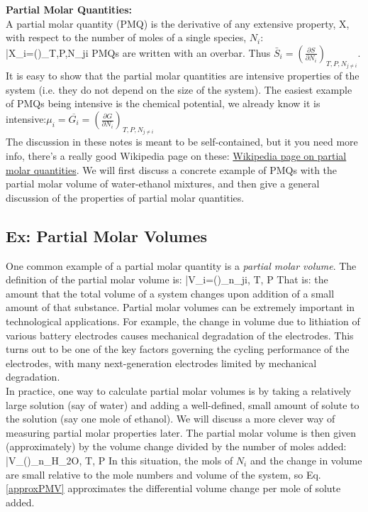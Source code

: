 \documentclass[12pt]{article}
\begin{document}
\textbf{Partial Molar Quantities:}\\
A partial molar quantity (PMQ) is the derivative of any extensive property, X, with respect to the number of moles of a single species, $N_i$:\\
\eqs \bar{X}_i=\left(\right)_{T,P,N_{j\neq i}}\eqe
PMQs are written with an overbar. Thus $\bar{S}_i=\left(\frac{\partial S}{\partial N_i}\right)_{T,P,N_{j\neq i}}$. It is easy to show that the partial molar quantities are intensive properties of the system (i.e. they do not depend on the size of the system). The easiest example of PMQs being intensive is the chemical potential, we already know it is intensive:$\mu _i=\overline{G_i}=\left(\frac{\partial G}{\partial N_i}\right)_{T,P,N_{j\neq i}}$\\
The discussion in these notes is meant to be self-contained, but it you need more info, there{'}s a really good Wikipedia page on these: \href{https://en.wikipedia.org/wiki/Partial_molar_property}{Wikipedia page on partial molar quantities}. We will first discuss a concrete example of PMQs with the partial molar volume of water-ethanol mixtures, and then give a general discussion of the properties of partial molar quantities.\\

\subsection{Ex: Partial Molar Volumes}
One common example of a partial molar quantity is a \emph{partial molar volume}. The definition of the partial molar volume is: 
\eqs\bar{V}_i=\left(\right)_{n_{j\neq i}, T, P}\eqe
That is: the amount that the total volume of a system changes upon addition of a small amount of that substance. Partial molar volumes can be extremely important in technological applications. For example, the change in volume due to lithiation of various battery electrodes causes mechanical degradation of the electrodes. This turns out to be one of the key factors governing the cycling performance of the electrodes, with many next-generation electrodes limited by mechanical degradation.\\
In practice, one way to calculate partial molar volumes is by taking a relatively large solution (say of water) and adding a well-defined, small amount of solute to the solution (say one mole of ethanol). We will discuss a more clever way of measuring partial molar properties later. The partial molar volume is then given (approximately) by the volume change divided by the number of moles added:
\eqs\bar{V}_{}\simeq \left(\right)_{n_{H_2O}, T, P}
\label{approxPMV}
\eqe
In this situation, the mols of $N_i$ and the change in volume are small relative to the mole numbers and volume of the system, so Eq. \ref{approxPMV} approximates the differential volume change per mole of solute added.
\end{document}
